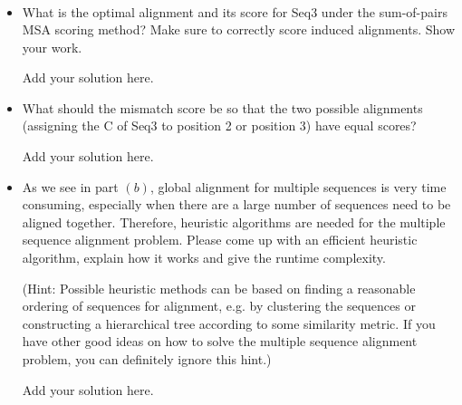 \begin{enumerate}
\begin{align*}
\end{align*}
\begin{itemize}
\item What is the optimal alignment and its score for Seq3 under the sum-of-pairs MSA scoring method? Make sure to correctly score induced alignments. Show your work.
\begin{solution}
Add your solution here.
\end{solution}
\item What should the mismatch score be so that the two possible alignments (assigning the C of Seq3 to position 2 or position 3) have equal scores?
\begin{solution}
Add your solution here.
\end{solution}

\item As we see in part $(b)$, global alignment for multiple sequences is very time consuming, especially when there are a large number of sequences need to be aligned together. Therefore, heuristic algorithms are needed for the multiple sequence alignment problem. Please come up with an efficient heuristic algorithm, explain how it works and give the runtime complexity. 

(Hint: Possible heuristic methods can be based on finding a reasonable ordering of sequences for alignment, e.g. by clustering the sequences or constructing a hierarchical tree according to some similarity metric. If you have other good ideas on how to solve the multiple sequence alignment problem, you can definitely ignore this hint.)
\begin{solution}
Add your solution here.
\end{solution}
\end{itemize}
\end{enumerate}
